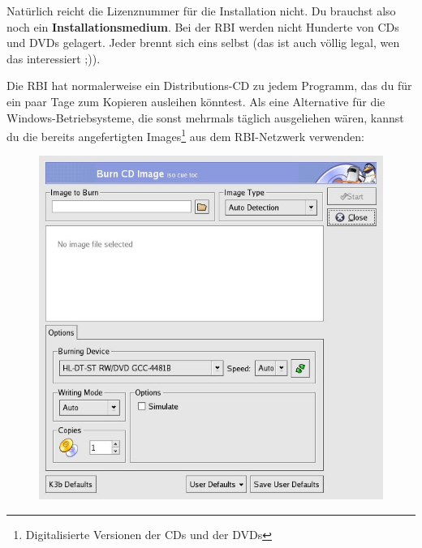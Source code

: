 Natürlich reicht die Lizenznummer für die Installation nicht. Du brauchst also noch ein \textbf{Installationsmedium}. Bei der RBI werden nicht Hunderte von CDs und DVDs gelagert. Jeder brennt sich eins selbst (das ist auch völlig legal, wen das interessiert ;)).

Die RBI hat normalerweise ein Distributions-CD zu jedem Programm, das du für ein paar Tage zum Kopieren ausleihen könntest.
Als eine Alternative für die Windows-Betriebsysteme, die sonst mehrmals täglich ausgeliehen wären, kannst du die bereits angefertigten Images\footnote{Digitalisierte Versionen der CDs und der DVDs} aus dem RBI-Netzwerk verwenden:
\begin{figure}
     \vspace{12mm}
   \begin{center}
     \includegraphics[scale=0.39]{bitmaps/gimp_brennen4}
   \end{center}
\end{figure}

